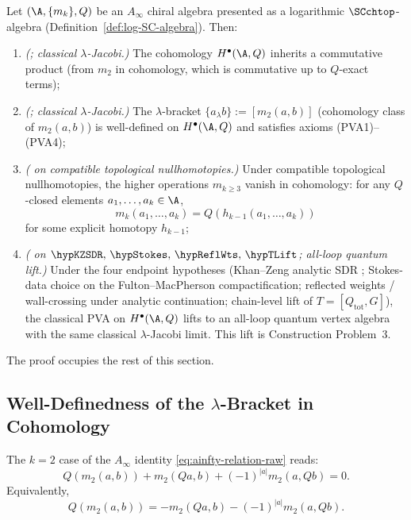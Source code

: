 \begin{theorem}
Let $(\A, \{m_k\}, Q)$ be an $A_\infty$ chiral algebra presented as a
logarithmic $\SCchtop$-algebra (Definition~\ref{def:log-SC-algebra}).
Then:
\begin{enumerate}[label=(\roman*)]
\item \emph{(\ClaimStatusProvedHere; classical $\lambda$-Jacobi.)}
The cohomology $H^\bullet(\A,Q)$ inherits a commutative product (from $m_2$ in cohomology, which is commutative up to $Q$-exact terms);

\item \emph{(\ClaimStatusProvedHere; classical $\lambda$-Jacobi.)}
The $\lambda$-bracket $\{a_\lambda b\} := [m_2(a,b)]$ (cohomology class of $m_2(a,b)$) is well-defined on $H^\bullet(\A,Q)$ and satisfies axioms (PVA1)--(PVA4);

\item \emph{(\ClaimStatusConditional{} on compatible topological
nullhomotopies.)}
Under compatible topological nullhomotopies, the higher
operations $m_{k \geq 3}$ vanish in cohomology: for any $Q$-closed
elements $a_1,\ldots,a_k \in \A$,
\[
m_k(a_1,\ldots,a_k) = Q(h_{k-1}(a_1,\ldots,a_k))
\]
for some explicit homotopy $h_{k-1}$;

\item \emph{(\ClaimStatusConditional{} on
$\hypKZSDR,\,\hypStokes,\,\hypReflWts,\,\hypTLift$; all-loop quantum lift.)}
Under the four endpoint hypotheses (Khan--Zeng analytic SDR
\cite{KZ25,Costello2011Renorm,CG17}; Stokes-data choice on the
Fulton--MacPherson compactification; reflected weights / wall-crossing
under analytic continuation; chain-level lift of
$T = [Q_{\mathrm{tot}}, G]$), the classical PVA on $H^\bullet(\A,Q)$
lifts to an all-loop quantum vertex algebra with the same classical
$\lambda$-Jacobi limit. This lift is Construction Problem~3.
\end{enumerate}
\end{theorem}

The proof occupies the rest of this section.

\subsection{Well-Definedness of the $\lambda$-Bracket in Cohomology}

\begin{proposition}
The $k=2$ case of the $A_\infty$ identity \eqref{eq:ainfty-relation-raw} reads:
\[
Q(m_2(a,b)) + m_2(Qa,b) + (-1)^{|a|} m_2(a,Qb)=0.
\]
Equivalently,
\[
Q(m_2(a,b))=-m_2(Qa,b)-(-1)^{|a|}m_2(a,Qb).
\]
\end{proposition}

